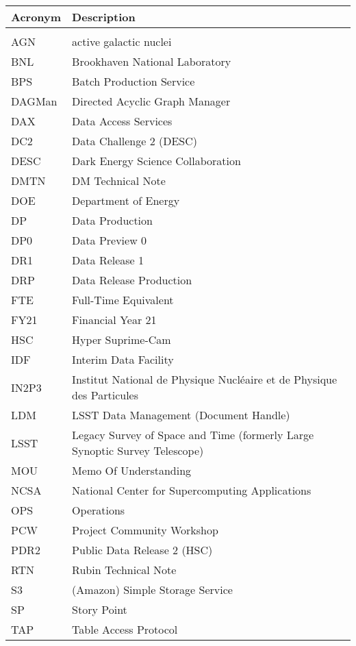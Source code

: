 \addtocounter{table}{-1}
\begin{longtable}{p{}p{}}\hline
\textbf{Acronym} & \textbf{Description}  \\\hline

 &  \\\hline
AGN & active galactic nuclei \\\hline
BNL & Brookhaven National Laboratory \\\hline
BPS & Batch Production Service \\\hline
DAGMan & Directed Acyclic Graph Manager \\\hline
DAX & Data Access Services \\\hline
DC2 & Data Challenge 2 (DESC) \\\hline
DESC & Dark Energy Science Collaboration \\\hline
DMTN & DM Technical Note \\\hline
DOE & Department of Energy \\\hline
DP & Data Production \\\hline
DP0 & Data Preview 0 \\\hline
DR1 & Data Release 1 \\\hline
DRP & Data Release Production \\\hline
FTE & Full-Time Equivalent \\\hline
FY21 & Financial Year 21 \\\hline
HSC & Hyper Suprime-Cam \\\hline
IDF & Interim Data Facility \\\hline
IN2P3 & Institut National de Physique Nucléaire et de Physique des Particules \\\hline
LDM & LSST Data Management (Document Handle) \\\hline
LSST & Legacy Survey of Space and Time (formerly Large Synoptic Survey Telescope) \\\hline
MOU & Memo Of Understanding \\\hline
NCSA & National Center for Supercomputing Applications \\\hline
OPS & Operations \\\hline
PCW & Project Community Workshop \\\hline
PDR2 & Public Data Release 2 (HSC) \\\hline
RTN & Rubin Technical Note \\\hline
S3 & (Amazon) Simple Storage Service  \\\hline
SP & Story Point \\\hline
TAP & Table Access Protocol \\\hline
\end{longtable}
